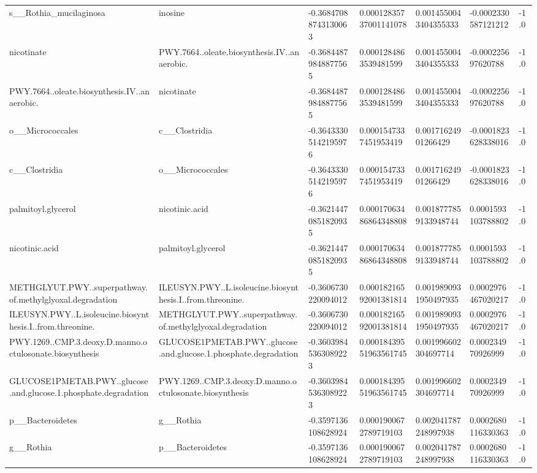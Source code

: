 \begin{longtable}{lllllll}
s\_\_Rothia\_mucilaginosa & inosine & -0.36847088743130063 & 0.00012835737001141078 & 0.0014550043404355333 & -0.0002330587121212 & -1.0 \\
nicotinate & PWY.7664..oleate.biosynthesis.IV..anaerobic. & -0.36844879848877565 & 0.0001284863539481599 & 0.0014550043404355333 & -0.000225697620788 & -1.0 \\
PWY.7664..oleate.biosynthesis.IV..anaerobic. & nicotinate & -0.36844879848877565 & 0.0001284863539481599 & 0.0014550043404355333 & -0.000225697620788 & -1.0 \\
o\_\_Micrococcales & c\_\_Clostridia & -0.36433305142195976 & 0.0001547337451953419 & 0.00171624901266429 & -0.0001823628338016 & -1.0 \\
c\_\_Clostridia & o\_\_Micrococcales & -0.36433305142195976 & 0.0001547337451953419 & 0.00171624901266429 & -0.0001823628338016 & -1.0 \\
palmitoyl.glycerol & nicotinic.acid & -0.36214470851820935 & 0.00017063486864348808 & 0.0018777859133948744 & 0.0001593103788802 & -1.0 \\
nicotinic.acid & palmitoyl.glycerol & -0.36214470851820935 & 0.00017063486864348808 & 0.0018777859133948744 & 0.0001593103788802 & -1.0 \\
METHGLYUT.PWY..superpathway.of.methylglyoxal.degradation & ILEUSYN.PWY..L.isoleucine.biosynthesis.I..from.threonine. & -0.3606730220094012 & 0.00018216592001381814 & 0.0019890931950497935 & 0.0002976467020217 & -1.0 \\
ILEUSYN.PWY..L.isoleucine.biosynthesis.I..from.threonine. & METHGLYUT.PWY..superpathway.of.methylglyoxal.degradation & -0.3606730220094012 & 0.00018216592001381814 & 0.0019890931950497935 & 0.0002976467020217 & -1.0 \\
PWY.1269..CMP.3.deoxy.D.manno.octulosonate.biosynthesis & GLUCOSE1PMETAB.PWY..glucose.and.glucose.1.phosphate.degradation & -0.36039845363089223 & 0.00018439551963561745 & 0.001996602304697714 & 0.000234970926999 & -1.0 \\
GLUCOSE1PMETAB.PWY..glucose.and.glucose.1.phosphate.degradation & PWY.1269..CMP.3.deoxy.D.manno.octulosonate.biosynthesis & -0.36039845363089223 & 0.00018439551963561745 & 0.001996602304697714 & 0.000234970926999 & -1.0 \\
p\_\_Bacteroidetes & g\_\_Rothia & -0.3597136108628924 & 0.0001900672789719103 & 0.002041787248997938 & 0.0002680116330363 & -1.0 \\
g\_\_Rothia & p\_\_Bacteroidetes & -0.3597136108628924 & 0.0001900672789719103 & 0.002041787248997938 & 0.0002680116330363 & -1.0 \\

\end{longtable}
